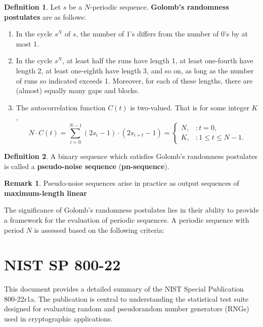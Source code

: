 \documentclass[12pt,openany]{book}
\theoremstyle{definition}
\newtheorem{definition}{Definition}[chapter]
\newtheorem{remark}{Remark}[chapter]
\begin{document}
	\begin{tcolorbox}[colback=white,colframe=defcolor,arc=5pt,title={\color{white}\bf Golomb's randomness postulates}]
		\begin{definition}
			Let \( s \) be a $N$-periodic sequence. \textbf{Golomb's randomness postulates} are as follows:
			\begin{enumerate}[\textbf{R}1]
				\item In the cycle \( s^N \) of \( s \), the number of 1’s differs from the number of 0’s by at most 1.
				\item In the cycle \( s^N \), at least half the runs have length 1, at least one-fourth have length 2, at least one-eighth have length 3, and so on, as long as the number of runs so indicated exceeds 1. Moreover, for each of these lengths, there are (almost) equally many gaps and blocks.
				\item The autocorrelation function \( C(t) \) is two-valued. That is for some integer \( K \),
				\[
				N \cdot C(t) = \sum_{i=0}^{N-1}(2s_i - 1) \cdot (2s_{i+t} - 1)=
				\begin{cases} 
					N, & : t = 0, \\
					K, & : 1 \leq t \leq N - 1.
				\end{cases}
				\]
			\end{enumerate}
		\end{definition}
	\end{tcolorbox}

	\begin{tcolorbox}[colback=white,colframe=defcolor,arc=5pt,title={\color{white}\bf \textbf{Pseudo-Noise Sequence} (\textbf{pn-sequence})}]
		\begin{definition}
			A binary sequence which satisfies Golomb's randomness postulates is called a \textbf{pseudo-noise sequence} (\textbf{pn-sequence}).
		\end{definition}
	\end{tcolorbox}
	\begin{remark}
		Pseudo-noise sequences arise in practice as output sequences of \textbf{maximum-length linear }
	\end{remark}
	
	The significance of Golomb’s randomness postulates lies in their ability to provide a framework for the evaluation of periodic sequences. A periodic sequence with period \( N \) is assessed based on the following criteria:
	
	\newpage
	\chapter{NIST SP 800-22}
	This document provides a detailed summary of the NIST Special Publication 800-22r1a. The publication is central to understanding the statistical test suite designed for evaluating random and pseudorandom number generators (RNGs) used in cryptographic applications.
	
\end{document}

